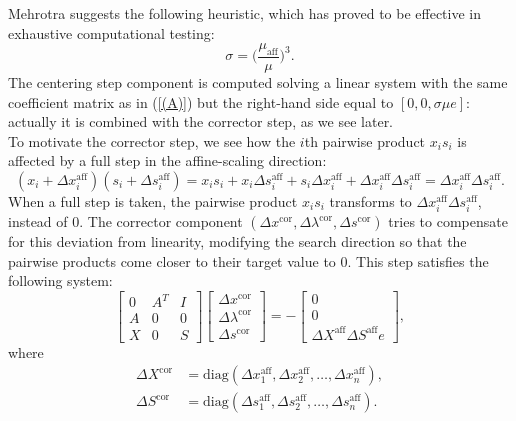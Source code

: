 \documentclass[a4paper,10 pt,titlepage,twoside]{book}
\theoremstyle{plain}
\theoremstyle{definition}
\theoremstyle{remark}
\begin{document}
Mehrotra \cite{MER} suggests the following heuristic, which has proved to be effective in exhaustive computational testing:
\begin{equation}\tag{4.22c}\label{CP}
\sigma = \bigg(\frac{\mu_{\text{aff}}}{\mu}\bigg)^{3}.
\end{equation}
The centering step component is computed solving a linear system with the same coefficient matrix as in (\ref{(A)}) but the right-hand side equal to $[0, 0,\sigma\mu e]$: actually it is combined with the corrector step, as we see later.\\
To motivate the corrector step, we see how the $i$th pairwise product $x_{i}s_{i}$ is affected by a full step in the affine-scaling direction:
\begin{equation*}
(x_{i}+\Delta x_{i}^{\text{aff}})(s_{i}+\Delta s_{i}^{\text{aff}})= x_{i}s_{i}+ x_{i}\Delta s_{i}^{\text{aff}}+s_{i}\Delta x_{i}^{\text{aff}}+\Delta x_{i}^{\text{aff}}\Delta s_{i}^{\text{aff}} =\Delta x_{i}^{\text{aff}}\Delta s_{i}^{\text{aff}}.
\end{equation*}
When a full step is taken, the pairwise product $x_{i}s_{i}$ transforms to $\Delta x_{i}^{\text{aff}}\Delta s_{i}^{\text{aff}}$, instead of 0. The corrector component $(\Delta x^{\text{cor}}, \Delta \lambda^{\text{cor}}, \Delta s^{\text{cor}})$ tries to compensate for this deviation from linearity, modifying the search direction so that the pairwise products come closer to their target value to 0. This step satisfies the following system:
\begin{equation}\label{(B)}
\begin{bmatrix}
0&A^{T}&I \\A&0&0\\X&0&S
\end{bmatrix}\begin{bmatrix}
\Delta x^{\text{cor}}\\\Delta\lambda^{\text{cor}} \\\Delta s^{\text{cor}}
\end{bmatrix}=-\begin{bmatrix}
0\\0\\\Delta X^{\text{aff}}\Delta S^{\text{aff}}e
\end{bmatrix},
\end{equation}
where
\begin{align*}
\Delta X^{\text{cor}}& = \text{diag}(\Delta x_{1}^{\text{aff}}, \Delta x_{2}^{\text{aff}},\dots,\Delta x_{n}^{\text{aff}}),\\
\Delta S^{\text{cor}}& = \text{diag}(\Delta s_{1}^{\text{aff}}, \Delta s_{2}^{\text{aff}},\dots,\Delta s_{n}^{\text{aff}}).
\end{align*}
\end{document}
